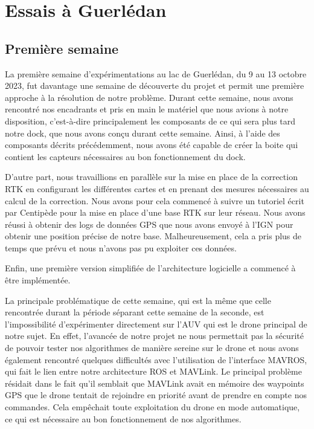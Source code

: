 \documentclass[12pt]{report}
\begin{document}
\chapter{Essais à Guerlédan}

\section{Première semaine}

La première semaine d'expérimentations au lac de Guerlédan, du 9 au 13 octobre 2023, fut davantage une semaine de découverte du projet et permit une première approche à la résolution de notre problème. 
Durant cette semaine, nous avons rencontré nos encadrants et pris en main le matériel que nous avions à notre disposition, c'est-à-dire principalement les composants de ce qui sera plus tard notre dock,
que nous avons conçu durant cette semaine. Ainsi, à l'aide des composants décrits précédemment, nous avons été capable de créer la boite qui contient les capteurs nécessaires au bon fonctionnement du dock. 

D'autre part, nous travaillions en parallèle sur la mise en place de la correction RTK en configurant les différentes cartes et en prenant des mesures nécessaires au calcul de la correction.
Nous avons pour cela commencé à suivre un tutoriel écrit par Centipède pour la mise en place d'une base RTK sur leur réseau. Nous avons réussi à obtenir des logs de données GPS que nous avons envoyé à l'IGN pour obtenir une position précise de notre base.
Malheureusement, cela a pris plus de temps que prévu et nous n'avons pas pu exploiter ces données.

Enfin, une première version simplifiée de l'architecture logicielle a commencé à être implémentée. 


La principale problématique de cette semaine, qui est la même que celle rencontrée durant la période séparant cette semaine de la seconde, est l'impossibilité d'expérimenter directement sur l'AUV qui 
est le drone principal de notre sujet. En effet, l'avancée de notre projet ne nous permettait pas la sécurité de pouvoir tester nos algorithmes de manière sereine sur le drone et nous avons également 
rencontré quelques difficultés avec l'utilisation de l'interface MAVROS, qui fait le lien entre notre architecture ROS et MAVLink. Le principal problème résidait dans le fait qu'il semblait que MAVLink 
avait en mémoire des waypoints GPS que le drone tentait de rejoindre en priorité avant de prendre en compte nos commandes. Cela empêchait toute exploitation du drone en mode automatique, ce qui est nécessaire
au bon fonctionnement de nos algorithmes.
\end{document}
